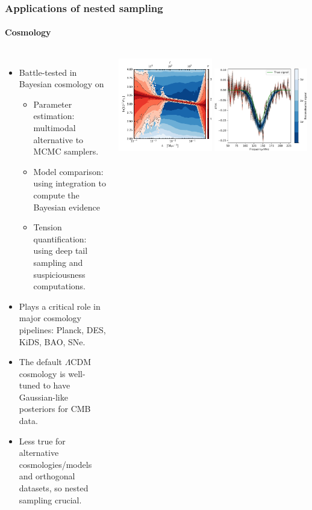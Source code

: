 \documentclass[aspectratio=169]{beamer}
\begin{document}
\begin{frame}
    \frametitle{Applications of nested sampling}
    \framesubtitle{Cosmology}
    \begin{columns}
        \begin{itemize}
            \item Battle-tested in Bayesian cosmology on
                \begin{itemize}
                    \item Parameter estimation: multimodal alternative to MCMC samplers.
                    \item Model comparison: using integration to compute the Bayesian evidence
                    \item Tension quantification: using deep tail sampling and suspiciousness computations.
                \end{itemize}
            \item Plays a critical role in major cosmology pipelines: Planck, DES, KiDS, BAO, SNe.
            \item The default $\Lambda$CDM cosmology is well-tuned to have Gaussian-like posteriors for CMB data. 
            \item Less true for alternative cosmologies/models and orthogonal datasets, so nested sampling crucial.
        \end{itemize}
        \includegraphics[width=0.49\textwidth]{figures/pps_both}
        \includegraphics[width=0.49\textwidth]{figures/reach_fit-cropped.pdf}

\end{columns}
\end{frame}
\end{document}
